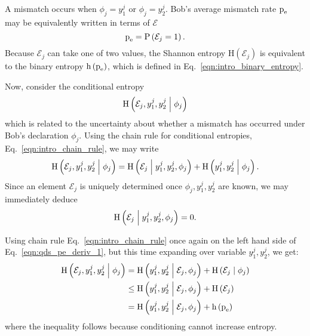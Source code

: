 A mismatch occurs when $\phi_j = y_1^j$ or $\phi_j = y_2^j$. Bob's average mismatch rate $\text{p}_{\text{e}}$ may be equivalently written in terms of $\mathcal{E}$
\begin{equation}
\text{p}_{\text{e}} = \text{P}\left(\mathcal{E}_j = 1\right). \notag
\end{equation}
Because $\mathcal{E}_j$ can take one of two values, the Shannon entropy $\text{H}\left(\mathcal{E}_j\right)$ is equivalent to the binary entropy $\text{h}\left(\text{p}_{\text{e}}\right)$, which is defined in Eq.~\ref{eqn:intro_binary_entropy}. %

Now, consider the conditional entropy
\begin{equation}\label{eqn:qds_starting_point}
\text{H}\left(\mathcal{E}_j, y_1^j, y_2^j \; \middle| \; \phi_j\right)
\end{equation}
which is related to the uncertainty about whether a mismatch has occurred under Bob's declaration $\phi_j$. Using the chain rule for conditional entropies, Eq.~\ref{eqn:intro_chain_rule}, we may write
\begin{equation}\label{eqn:qds_pe_deriv_1}
\text{H}\left( \mathcal{E}_j, y_1^j, y_2^j \; \middle| \; \phi_j \right) = 
\text{H}\left( \mathcal{E}_j \; \middle| \; y_1^j, y_2^j, \phi_j\right) + 
\text{H}\left( y_1^j, y_2^j \; \middle| \; \phi_j\right).
\end{equation}
Since an element $\mathcal{E}_j$ is uniquely determined once $\phi_j, y_1^j, y_2^j$ are known, we may immediately deduce
\begin{equation}
\text{H}\left( \mathcal{E}_j \; \middle| \; y_1^j, y_2^j, \phi_j\right) = 0. \notag
\end{equation}

\noindent Using chain rule Eq.~\ref{eqn:intro_chain_rule} once again on the left hand side of Eq.~\ref{eqn:qds_pe_deriv_1}, but this time expanding over variable $y_1^j, y_2^j$, we get:
\begin{align}\label{eqn:qds_pe_deriv_2}
\text{H}\left( \mathcal{E}_j, y_1^j, y_2^j \; \middle| \; \phi_j \right) &=
\text{H}\left(y_1^j, y_2^j \; \middle| \; \mathcal{E}_j, \phi_j\right) + \text{H}\left(\mathcal{E}_j \; \middle| \; \phi_j\right) \notag \\
&\le \text{H}\left(y_1^j, y_2^j \; \middle| \; \mathcal{E}_j, \phi_j\right) + \text{H}\left(\mathcal{E}_j\right) \notag \\
&= \text{H}\left(y_1^j, y_2^j \; \middle| \; \mathcal{E}_j, \phi_j\right) + \text{h}\left(\text{p}_{\text{e}}\right)
\end{align}
where the inequality follows because conditioning cannot increase entropy.

